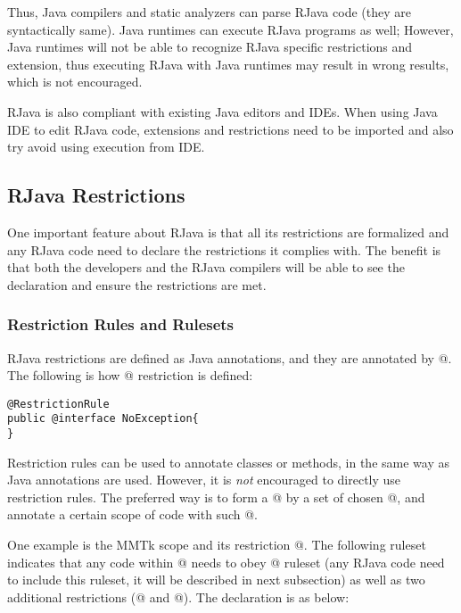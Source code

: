 \documentclass[12pt]{article}
\begin{document}
\noindent
Thus, Java compilers and static analyzers can 
parse RJava code (they are syntactically same).
Java runtimes can
execute RJava programs as well; However, Java runtimes
will not be able to recognize RJava
specific restrictions and extension, thus executing
RJava with Java runtimes may result in wrong results, which
is not encouraged. 

RJava is also compliant with existing Java editors and IDEs. 
When using Java IDE to edit RJava code, extensions and restrictions
need to be imported and also try avoid using execution from IDE. 

\subsection{RJava Restrictions}

One important feature about RJava is that all its restrictions 
are formalized and any RJava code need to declare the restrictions
it complies with. The benefit is that both the developers
and the RJava compilers will be able to see the declaration
and ensure the restrictions are met. 

\subsubsection{Restriction Rules and Rulesets}

RJava restrictions are defined as Java annotations, and they are
annotated by @. 
The following is how @ restriction is defined:

\begin{lstlisting}
@RestrictionRule
public @interface NoException{
}
\end{lstlisting}

Restriction rules can be used to annotate classes or methods, in the same way as
Java annotations are used. However, it is \emph{not} encouraged to directly use
restriction rules. The preferred way is to form a @ by
a set of chosen @, and annotate a certain scope of code 
with such @. 

One example is the MMTk scope and its restriction @. The following
ruleset indicates that any code within @ needs to obey 
@ ruleset (any RJava code need to include this ruleset, it will be
described in next subsection) as well as two additional restrictions
(@ and @). The
declaration is as below:
\end{document}
